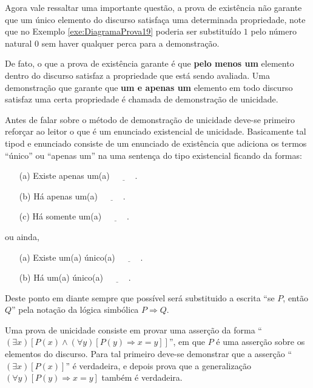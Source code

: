 Agora vale ressaltar uma importante questão, a prova de existência não garante que um único elemento do discurso satisfaça uma determinada propriedade, note que no Exemplo \ref{exe:DiagramaProva19} poderia ser substituído $1$ pelo número natural $0$ sem haver qualquer perca para a demonstração. 

De fato, o que a prova de existência garante é que \textbf{pelo menos um} elemento dentro do discurso satisfaz a propriedade que está sendo avaliada. Uma demonstração que garante que \textbf{um e apenas um} elemento em todo discurso satisfaz uma certa propriedade é chamada de demonstração de unicidade.

Antes de falar sobre o método de demonstração de unicidade deve-se primeiro reforçar ao leitor o que é um enunciado existencial de unicidade. Basicamente tal tipod e enunciado consiste de um enunciado de existência que adiciona os termos ``único'' ou ``apenas um'' na uma sentença do tipo existencial ficando da formas:
\begin{itemize}
	\item[(a)] Existe apenas um(a) $\underline{\ \ \ \ \ \ \ \ \ \ \ \ }$.
	\item[(b)] Há apenas um(a) $\underline{\ \ \ \ \ \ \ \ \ \ \ \ }$.
  \item[(c)] Há somente um(a) $\underline{\ \ \ \ \ \ \ \ \ \ \ \ }$.
\end{itemize}
ou ainda,
\begin{itemize}
	\item[(a)] Existe um(a) único(a) $\underline{\ \ \ \ \ \ \ \ \ \ \ \ }$.
	\item[(b)] Há  um(a) único(a) $\underline{\ \ \ \ \ \ \ \ \ \ \ \ }$.
\end{itemize}

\begin{nota}[Simbologia]
  Deste ponto em diante sempre que possível será substituido a escrita ``se $P$, então $Q$'' pela notação da lógica simbólica $P \Rightarrow Q$.
\end{nota}

\begin{definicao}\label{def:ProvaUnicidade}
	Uma prova de unicidade consiste em provar uma asserção da forma ``$(\exists x)[P(x) \land (\forall y)[P(y) \Rightarrow x = y]]$'', em que $P$ é uma asserção sobre os elementos do discurso. Para tal primeiro deve-se demonstrar que a asserção ``$(\exists x)[P(x)]$'' é verdadeira, e depois prova que a generalização $(\forall y)[P(y) \Rightarrow x = y]$ também é verdadeira.
\end{definicao}

